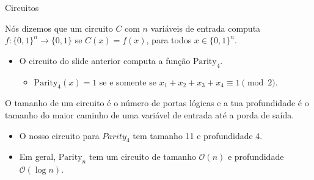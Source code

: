 \documentclass[landscape, 9pt]{beamer}
\newcommand{\binalph}{\{0, 1\}}
\newcommand{\Parity}{\text{Parity}}
\begin{document}
\begin{frame} {Circuitos}

Nós dizemos que um circuito $C$ com $n$ variáveis de entrada computa $f: \binalph^{n} \to \binalph$ se $C(x) = f(x)$, para todos $x \in \binalph^{n}$.

\begin{itemize}

	\item O circuito do slide anterior computa a função $\Parity_{4}$.
	
	\begin{itemize}
	
		\item $\Parity_{4}(x) = 1$ se e somente se $x_{1} + x_{2} + x_{3} + x_{4} \equiv 1 \pmod{2}$.
		
	\end{itemize}

\end{itemize}

O tamanho de um circuito é o número de portas lógicas e a tua profundidade é o tamanho do maior caminho de uma variável de entrada até a porda de saída.

\begin{itemize}

	\item O nosso circuito para $Parity_{4}$ tem tamanho 11 e profundidade 4.
	
	\item Em geral, $\Parity_{n}$ tem um circuito de tamanho $\mathcal{O}(n)$ e profundidade $\mathcal{O}(\log n)$.

\end{itemize}

\end{frame}

\end{document}
